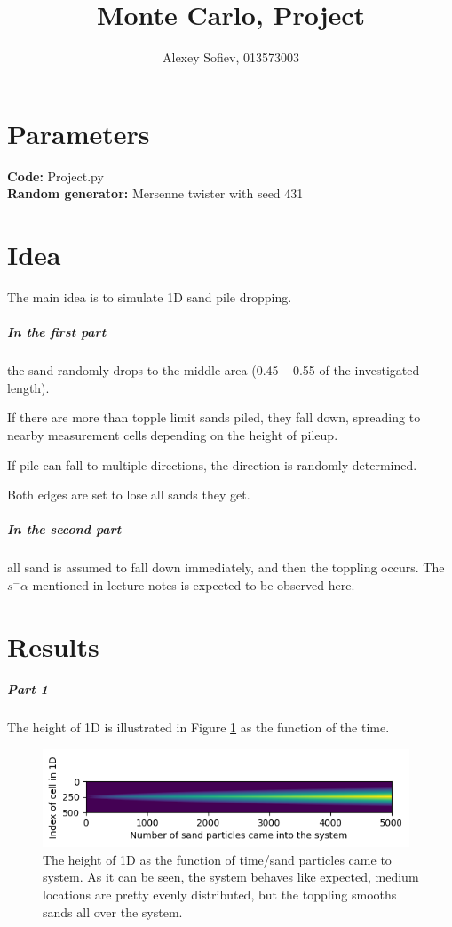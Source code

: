 \documentclass{article}
\begin{document}
\title{Monte Carlo, Project}
\author{Alexey Sofiev, 013573003}
\date{}

\maketitle


\section{Parameters}
\textbf{Code:} Project.py \\
\textbf{Random generator: } Mersenne twister with seed 431 \\


\section{Idea}

The main idea is to simulate 1D sand pile dropping.

\subparagraph*{In the first part} the sand randomly drops to the middle area (0.45 -- 0.55 of the investigated length).

If there are more than topple limit sands piled, they fall down, spreading to nearby measurement cells depending on the height of pileup.

If pile can fall to multiple directions, the direction is randomly determined.

Both edges are set to lose all sands they get.

\subparagraph*{In the second part} all sand is assumed to fall down immediately, and then the toppling occurs. The $s^-\alpha$ mentioned in lecture notes is expected to be observed here. 

\section{Results}

\subparagraph*{Part 1}
The height of 1D is illustrated in Figure \ref{fig:pileup} as the function of the time.

\begin{figure}[!hbt]
	\centering
	\includegraphics[width=4.3in]{pileup}
	\caption{The height of 1D as the function of time/sand particles came to system. As it can be seen, the system behaves like expected, medium locations are pretty evenly distributed, but the toppling smooths sands all over the system.}
	\label{fig:pileup}
\end{figure}
\end{document}
